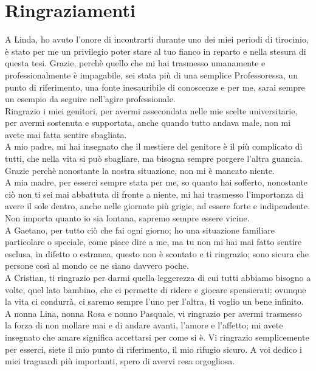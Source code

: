\chapter*{Ringraziamenti}

A Linda, ho avuto l'onore di incontrarti durante uno dei miei periodi di tirocinio, è stato per me un privilegio poter
stare al tuo fianco in reparto e nella stesura di questa tesi. Grazie, perchè quello che mi hai trasmesso umanamente e
professionalmente è impagabile, sei stata più di una semplice Professoressa, un punto di riferimento,
una fonte inesauribile di conoscenze e per me, sarai sempre un esempio da seguire nell'agire professionale.\\
Ringrazio i miei genitori, per avermi assecondata nelle mie scelte universitarie, per avermi sostenuta e supportata,
anche quando tutto andava male, non mi avete mai fatta sentire sbagliata.\\
A mio padre, mi hai insegnato che il mestiere del genitore è il più complicato di tutti,
che nella vita si può sbagliare, ma bisogna sempre porgere l'altra guancia. Grazie perchè nonostante la nostra situazione,
non mi è mancato niente.\\
A mia madre, per esserci sempre stata per me, so quanto hai sofferto, nonostante ciò non ti sei mai abbattuta di fronte a 
niente, mi hai trasmesso l'importanza di avere il sole dentro, anche nelle giornate più grigie, ad essere forte e indipendente. 
Non importa quanto io sia lontana, sapremo sempre essere vicine.\\
A Gaetano, per tutto ciò che fai ogni giorno; ho una situazione familiare
particolare o speciale, come piace dire a me, ma tu non mi hai mai fatto sentire esclusa, in difetto o estranea,
questo non è scontato e ti ringrazio; sono sicura che persone così al mondo ce ne siano davvero poche.\\
A Cristian, ti ringrazio per darmi quella leggerezza di cui tutti abbiamo
bisogno a volte, quel lato bambino, che ci permette di ridere e giocare spensierati; ovunque la vita ci condurrà, 
ci saremo sempre l'uno per l'altra, ti voglio un bene infinito.\\
A nonna Lina, nonna Rosa e nonno Pasquale, vi ringrazio per avermi trasmesso la forza di non mollare mai e di andare
avanti, l'amore e l'affetto; mi avete insegnato che amare significa accettarsi per come si è. Vi
ringrazio semplicemente per esserci, siete il mio punto di riferimento, il mio rifugio sicuro. A voi dedico i miei
traguardi più importanti, spero di avervi resa orgogliosa.\\
